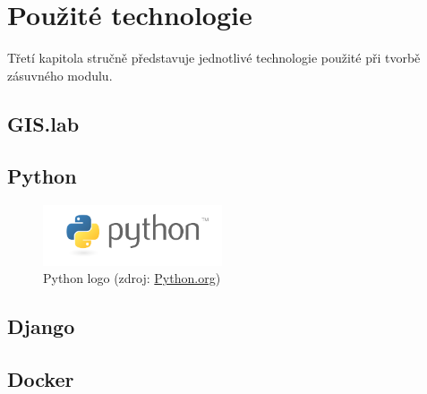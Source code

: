 \chapter{Použité technologie}
\label{3-technologie}

Třetí kapitola stručně představuje jednotlivé technologie použité při
tvorbě zásuvného modulu.

\section{GIS.lab}


\section{Python}

\begin{figure}[H] \centering
      \includegraphics[width=150pt]{./pictures/python-logo-master-v3-TM.png}
      \caption[Python logo]{Python logo (zdroj:
\href{https://www.python.org/static/community_logos/python-logo-master-v3-TM.png}{Python.org})}
      \label{fig:python}
  \end{figure}
  
  
\section{Django}


\section{Docker}


